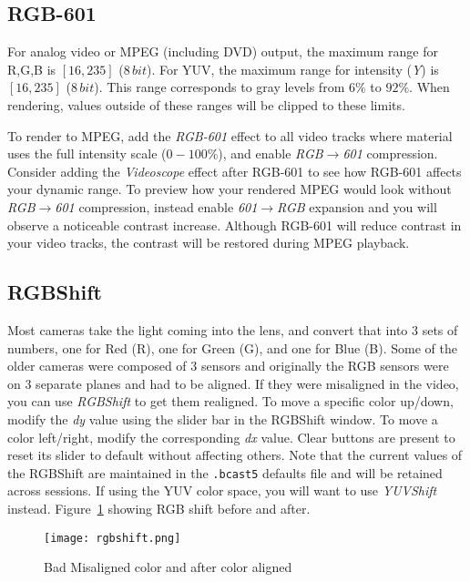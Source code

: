 \subsection{RGB-601}%
\label{sub:rgb-601}

For analog video or MPEG (including DVD) output, the maximum range for R,G,B is $[16,235]$ ($8\,bit$). For YUV, the maximum range for intensity (\textit{Y}) is $[16, 235]$ ($8\,bit$). This range corresponds to gray levels from $6\%$ to $92\%$. When rendering, values outside of these ranges will be clipped to these limits.

To render to MPEG, add the \textit{RGB-601} effect to all video tracks where material uses the full intensity scale ($0-100\%$), and enable \textit{RGB$\rightarrow$601} compression. Consider adding the \textit{Videoscope} effect after RGB-601 to see how RGB-601 affects your dynamic range. To preview how your rendered MPEG would look without \textit{RGB$\rightarrow$601} compression, instead enable \textit{601$\rightarrow$RGB} expansion and you will observe a noticeable contrast increase. Although RGB-601 will reduce contrast in your video tracks, the contrast will be restored during MPEG playback.

\subsection{RGBShift}%
\label{sub:rgb-shift}

Most cameras take the light coming into the lens, and convert that into $3$ sets of numbers, one for Red (R), one for Green (G), and one for Blue (B). Some of the older cameras were composed of $3$ sensors and originally the RGB sensors were on $3$ separate planes and had to be aligned. If they were misaligned in the video, you can use \textit{RGBShift} to get them realigned. To move a specific color up/down, modify the \textit{dy} value using the slider bar in the RGBShift window. To move a color left/right, modify the corresponding \textit{dx} value. Clear buttons are present to reset its slider to default without affecting others. Note that the current values of the RGBShift are maintained in the \texttt{.bcast5} defaults file and will be retained across sessions. If using the YUV color space, you will want to use \textit{YUVShift} instead. Figure~\ref{fig:rgbshift} showing RGB shift before and after.

\begin{figure}[hbtp]
    \centering
    \texttt{[image: rgbshift.png]}
    \caption{Bad Misaligned color and after color aligned}
    \label{fig:rgbshift}
\end{figure}

